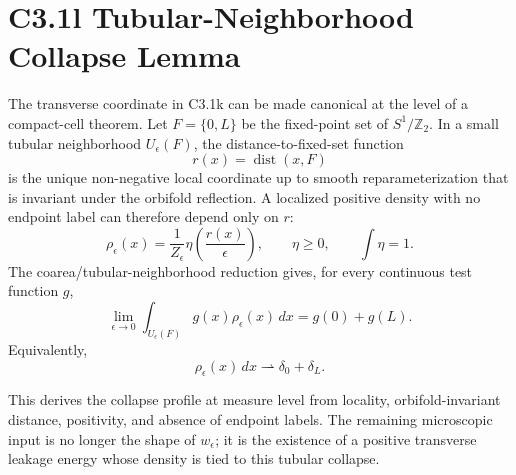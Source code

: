 \documentclass[11pt]{article}
\begin{document}
\section{C3.1l Tubular-Neighborhood Collapse Lemma}
The transverse coordinate in C3.1k can be made canonical at the level of a
compact-cell theorem.  Let $F=\{0,L\}$ be the fixed-point set of
$S^1/\mathbb Z_2$.  In a small tubular neighborhood $U_\epsilon(F)$, the
distance-to-fixed-set function
\begin{equation}
r(x)=\operatorname{dist}(x,F)
\end{equation}
is the unique non-negative local coordinate up to smooth reparameterization that
is invariant under the orbifold reflection.  A localized positive density with
no endpoint label can therefore depend only on $r$:
\begin{equation}
\rho_\epsilon(x)=\frac{1}{Z_\epsilon}\eta\!\left(\frac{r(x)}{\epsilon}\right),
\qquad
\eta\geq0,\qquad
\int\eta=1 .
\end{equation}
The coarea/tubular-neighborhood reduction gives, for every continuous test
function $g$,
\begin{equation}
\lim_{\epsilon\to0}\int_{U_\epsilon(F)}g(x)\rho_\epsilon(x)\,dx
=g(0)+g(L).
\end{equation}
Equivalently,
\begin{equation}
\rho_\epsilon(x)\,dx\rightharpoonup \delta_0+\delta_L .
\end{equation}

This derives the collapse profile at measure level from locality,
orbifold-invariant distance, positivity, and absence of endpoint labels.  The
remaining microscopic input is no longer the shape of $w_\epsilon$; it is the
existence of a positive transverse leakage energy whose density is tied to this
tubular collapse.
\end{document}
